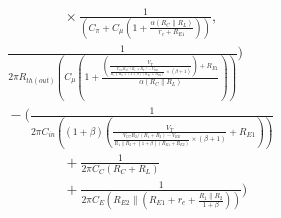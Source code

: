 \documentclass[11pt, a4paper]{article}
\begin{document}
\begin{align*}
&\qquad\qquad\qquad \times \frac{1}{(C_\pi + C_\mu \left(1 + \frac{\alpha(R_C \parallel R_L)}{r_e + R_{E1}}\right))}, \\
&\qquad \frac{1}{2\pi R_{th(out)} (C_\mu \left(1 + \frac{(\frac{V_T}{\frac{V_{CC}R_2/(R_1+R_2)-V_{BE}}{R_1 \parallel R_2 + (1+\beta)(R_{E1}+R_{E2})} \times (\beta + 1)}) + R_{E1}}{\alpha(R_C \parallel R_L)}\right))}
\Bigg) \\
&\qquad - \Bigg(
    \frac{1}{2\pi C_{in} ((1+\beta) (\frac{V_T}{\frac{V_{CC}R_2/(R_1+R_2)-V_{BE}}{R_1 \parallel R_2 + (1+\beta)(R_{E1}+R_{E2})} \times (\beta + 1)} + R_{E1}))} \\
&\qquad\qquad\qquad + \frac{1}{2\pi C_C (R_C + R_L)} \\
&\qquad\qquad\qquad + \frac{1}{2\pi C_E \left(R_{E2} \parallel \left(R_{E1} + r_e + \frac{R_1 \parallel R_2}{1+\beta}\right)\right)}
\Bigg)
\end{align*}
\end{document}
